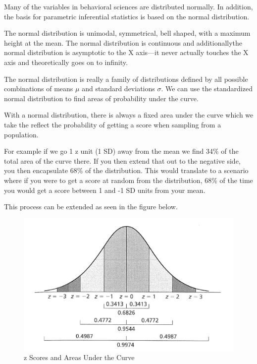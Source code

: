 \documentclass[]{book}
\theoremstyle{definition}
\theoremstyle{definition}
\theoremstyle{definition}
\theoremstyle{remark}
\begin{document}
Many of the variables in behavioral sciences are distributed normally.
In addition, the basis for parametric inferential statistics is based on
the normal distribution.

The normal distribution is unimodal, symmetrical, bell shaped, with a
maximum height at the mean. The normal distribution is continuous and
additionallythe normal distribution is asymptotic to the X axis---it
never actually touches the X axis and theoretically goes on to infinity.

The normal distribution is really a family of distributions defined by
all possible combinations of means \(\mu\) and standard deviations
\(\sigma\). We can use the standardized normal distribution to find
areas of probability under the curve.

With a normal distribution, there is always a fixed area under the curve
which we take the reflect the probability of getting a score when
sampling from a population.

For example if we go 1 z unit (1 SD) away from the mean we find 34\% of
the total area of the curve there. If you then extend that out to the
negative side, you then encapsulate 68\% of the distribution. This would
translate to a scenario where if you were to get a score at random from
the distribution, 68\% of the time you would get a score between 1 and
-1 SD units from your mean.

This process can be extended as seen in the figure below.

\begin{figure}
\centering
\includegraphics{img/hickszscores1.png}
\caption{z Scores and Areas Under the Curve}
\end{figure}
\end{document}
